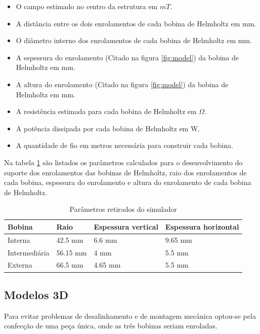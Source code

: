 \begin{itemize}
    \item O campo estimado no centro da estrutura em $mT$.
    \item A distância entre os dois enrolamentos de cada bobina de Helmholtz em mm.
    \item O diâmetro interno dos enrolamentos de cada bobina de Helmholtz em mm.
    \item A espessura do enrolamento (Citado na figura \ref{fig:model}) da bobina de Helmholtz em mm.
    \item A altura do enrolamento (Citado na figura \ref{fig:model}) da bobina de Helmholtz em mm.
    \item A resistência estimada para cada bobina de Helmholtz em $\Omega$.
    \item A potência dissipada por cada bobina de Helmholtz em W.
    \item A quantidade de fio em metros necessária para construir cada bobina.
\end{itemize}

Na tabela \ref{tab:paramSim} são listados os parâmetros calculados para o desenvolvimento do suporte dos enrolamentos das bobinas de Helmholtz, raio dos enrolamentos de cada bobina, espessura do enrolamento e altura do enrolamento de cada bobina de Helmholtz.

\begin{table}[H]
    \centering
    \caption{Parâmetros retirados do simulador}
    \begin{tabular}{ |p{2.5cm}|p{2cm}|p{3.9cm}|p{4.4cm}|}
     \hline
     \textbf{Bobina} & \textbf{Raio} & \textbf{Espessura vertical}& \textbf{Espessura horizontal} \\
     \hline
     Interna & 42.5 mm & 6.6 mm & 9.65 mm \\
     Intermediária & 56.15 mm & 4 mm & 5.5 mm \\
     Externa & 66.5 mm & 4.65 mm & 5.5 mm \\
     \hline
    \end{tabular}
    \label{tab:paramSim}
\end{table}


\subsection{Modelos 3D}

Para evitar problemas de desalinhamento e de montagem mecânica optou-se pela confecção de uma peça única, onde as três bobinas seriam enroladas.

